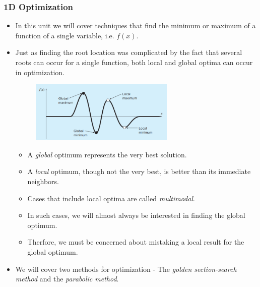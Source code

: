 \documentclass{if-beamer}
\begin{document}
\begin{frame}[t]
	\frametitle{1D Optimization}
	\begin{itemize}
		\item In this unit we will cover techniques that find the minimum or maximum of a function of a single variable, i.e. $f(x)$.
		\item Just as finding the root location was complicated by the fact that several roots can occur for a single function, both local
		and global optima can occur in optimization.
		\begin{figure}
			\centering
			\includegraphics[width = 0.65\textwidth]{figures/localglobal}
		\end{figure}
		\begin{itemize}
			\item A \textit{global} optimum represents the very best solution. 
			\item A \textit{local} optimum, though not the very best, is better than its immediate neighbors. 
			\item Cases that include local optima are called \textit{multimodal}. 
			\item In such cases, we will almost always be interested in finding the global optimum.
			\item Therfore, we must be concerned about mistaking a local result for the global optimum. 
		\end{itemize}
		\item We will cover two methods for optimization - The \textit{golden section-search method} and the \textit{parabolic method}.
	\end{itemize}
\end{frame}
\end{document}
